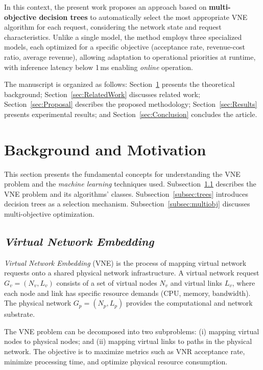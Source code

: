 \documentclass[runningheads]{llncs}
\begin{document}
In this context, the present work proposes an approach based on \textbf{multi-objective decision trees} to automatically select the most appropriate VNE algorithm for each request, considering the network state and request characteristics.
Unlike a single model, the method employs three specialized models, each optimized for a specific objective (acceptance rate, revenue-cost ratio, average revenue), allowing adaptation to operational priorities at runtime, with inference latency below 1\,ms enabling \textit{online} operation.

The manuscript is organized as follows: Section~\ref{sec:RefTeo} presents the theoretical background; Section~\ref{sec:RelatedWork} discusses related work; Section~\ref{sec:Proposal} describes the proposed methodology; Section~\ref{sec:Results} presents experimental results; and Section~\ref{sec:Conclusion} concludes the article.

\section{Background and Motivation}
\label{sec:RefTeo}

This section presents the fundamental concepts for understanding the VNE problem and the \textit{machine learning} techniques used.
Subsection~\ref{subsec:vne} describes the VNE problem and its algorithms' classes.
Subsection~\ref{subsec:trees} introduces decision trees as a selection mechanism.
Subsection~\ref{subsec:multiobj} discusses multi-objective optimization.

\subsection{\textit{Virtual Network Embedding}}
\label{subsec:vne}

\textit{Virtual Network Embedding} (VNE) is the process of mapping virtual network requests onto a shared physical network infrastructure.
A virtual network request $G_v = (N_v, L_v)$ consists of a set of virtual nodes $N_v$ and virtual links $L_v$, where each node and link has specific resource demands (CPU, memory, bandwidth).
The physical network $G_p = (N_p, L_p)$ provides the computational and network substrate.

The VNE problem can be decomposed into two subproblems: (i) mapping virtual nodes to physical nodes; and (ii) mapping virtual links to paths in the physical network. The objective is to maximize metrics such as VNR acceptance rate, minimize processing time, and optimize physical resource consumption.
\end{document}
